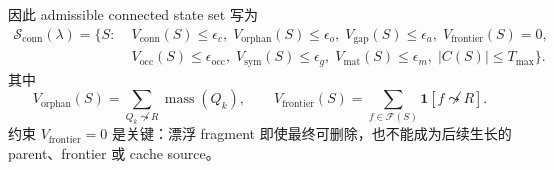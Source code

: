 因此 admissible connected state set 写为
\begin{equation}
\begin{split}
\mathcal{S}_{\mathrm{conn}}(\lambda)=
\{S:\;&
V_{\mathrm{conn}}(S)\le \epsilon_c,\;
V_{\mathrm{orphan}}(S)\le \epsilon_o,\;
V_{\mathrm{gap}}(S)\le \epsilon_a,\;
V_{\mathrm{frontier}}(S)=0,\\
&
V_{\mathrm{occ}}(S)\le \epsilon_{\mathrm{occ}},\;
V_{\mathrm{sym}}(S)\le \epsilon_g,\;
V_{\mathrm{mat}}(S)\le \epsilon_m,\;
|C(S)|\le T_{\max}\}.
\end{split}
\end{equation}
其中
\begin{equation}
V_{\mathrm{orphan}}(S)=\sum_{Q_k\not\leadsto R}\operatorname{mass}(Q_k),\qquad
V_{\mathrm{frontier}}(S)=\sum_{f\in\mathcal{F}(S)}\mathbf{1}[f\not\leadsto R].
\end{equation}
约束 \(V_{\mathrm{frontier}}=0\) 是关键：漂浮 fragment 即使最终可删除，也不能成为后续生长的 parent、frontier 或 cache source。

